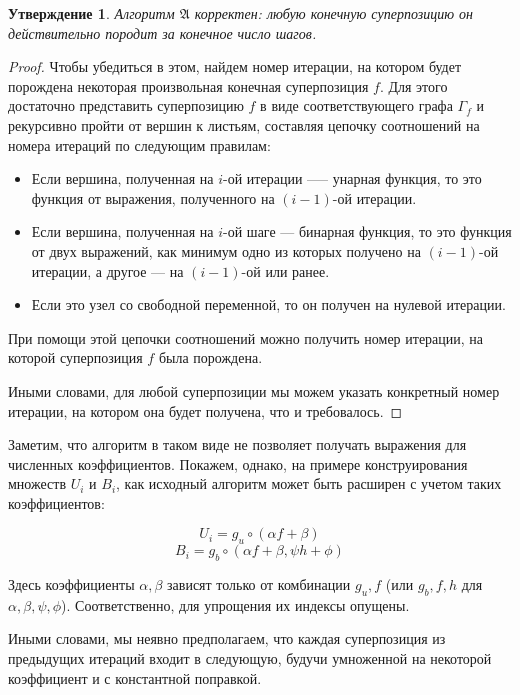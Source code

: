 \documentclass[12pt,a4paper]{amsart}
\newtheorem{stat}{Утверждение}
\begin{document}
\begin{stat}
  Алгоритм $\mathfrak{A}$ корректен: любую конечную суперпозицию он
  действительно породит за конечное число шагов.
\end{stat}
\begin{proof}
  Чтобы убедиться в этом, найдем номер итерации, на котором будет порождена
  некоторая произвольная конечная суперпозиция $f$. Для этого достаточно
  представить суперпозицию $f$ в виде соответствующего графа $\Gamma_f$
  и рекурсивно пройти от вершин к листьям, составляя цепочку соотношений
  на номера итераций по следующим правилам:

  \begin{itemize}
	\item Если вершина, полученная на $i$-ой итерации —-- унарная функция,
	  то это функция от выражения, полученного на $(i-1)$-ой итерации.
	\item Если вершина, полученная на $i$-ой шаге --- бинарная функция, то
	  это функция от двух выражений, как минимум одно из которых получено
	  на $(i-1)$-ой итерации, а другое --- на $(i-1)$-ой или ранее.
	\item Если это узел со свободной переменной, то он получен на нулевой
	  итерации.
  \end{itemize}

  При помощи этой цепочки соотношений можно получить номер итерации, на
  которой суперпозиция $f$ была порождена.
  
  Иными словами, для любой суперпозиции мы можем указать конкретный номер
  итерации, на котором она будет получена, что и требовалось.
\end{proof}

Заметим, что алгоритм в таком виде не позволяет получать выражения для
численных коэффициентов. Покажем, однако, на примере конструирования
множеств $U_i$ и $B_i$, как исходный алгоритм может быть расширен с учетом
таких коэффициентов:

\[
U_i = { g_u \circ (\alpha f + \beta) }
\]
\[
B_i = { g_b \circ (\alpha f + \beta, \psi h + \phi) }
\]

Здесь коэффициенты $\alpha, \beta$ зависят только от комбинации $g_u, f$ (или
$g_b, f, h$ для $\alpha, \beta, \psi, \phi$). Соответственно, для упрощения
их индексы опущены.

Иными словами, мы неявно предполагаем, что каждая суперпозиция из предыдущих
итераций входит в следующую, будучи умноженной на некоторой коэффициент и с
константной поправкой.
\end{document}
